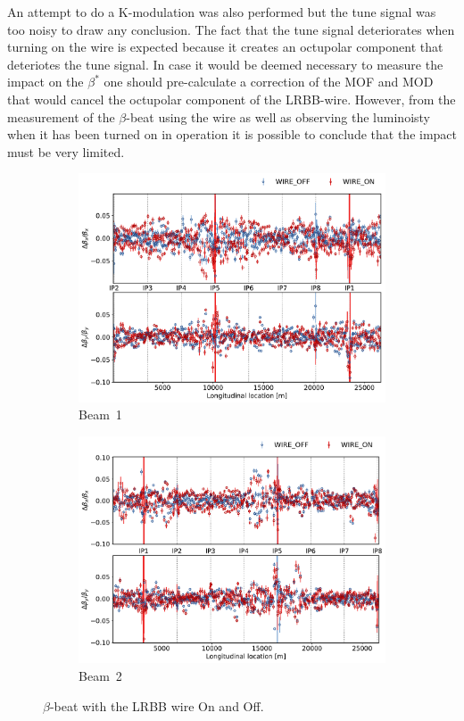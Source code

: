 \documentclass{cernatsnote}
\begin{document}
An attempt to do a K-modulation was also performed but the tune signal was too noisy to draw any conclusion. The fact that the tune signal deteriorates when turning on the wire is expected because it creates an octupolar component that deteriotes the tune signal. In case it would be deemed necessary to measure the impact on the $\beta^*$ one should pre-calculate a correction of the MOF and MOD that would cancel the octupolar component of the LRBB-wire. However, from the measurement of the $\beta$-beat using the wire as well as observing the luminoisty when it has been turned on in operation it is possible to conclude that the impact must be very limited. 

\begin{figure}[ht]
\begin{subfigure}{.5\textwidth}
  \centering
  \includegraphics[width=.8\linewidth]{wire/beam1_beta_beat.pdf}  
  \caption{Beam~1}
\end{subfigure}
\begin{subfigure}{.5\textwidth}
  \centering
  \includegraphics[width=.8\linewidth]{wire/beam2_beta_beat.pdf}  
  \caption{Beam~2}
\end{subfigure}
\caption{$\beta$-beat with the LRBB wire On and Off.}
\label{fig:before_after_pre_cycle}
\end{figure}




\end{document}
